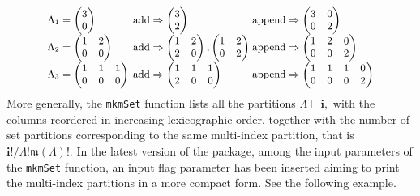 \[{\small \begin{array}{lll}
\Lambda_1= \begin{pmatrix}
3 \\
0
\end{pmatrix} & \!\!\!\!\hbox{add} \Rightarrow \begin{pmatrix}
3 \\
2
\end{pmatrix}  & \!\!\!\!\!\hbox{append} \Rightarrow \begin{pmatrix}
3 & 0 \\
0 & 2
\end{pmatrix}\\
\Lambda_2= \begin{pmatrix}
1 & 2 \\
0 & 0
\end{pmatrix} &\!\!\!\!\hbox{add} \Rightarrow \begin{pmatrix}
1 & 2 \\
2 & 0
\end{pmatrix}, \begin{pmatrix}
1 & 2 \\
0 & 2
\end{pmatrix} & \!\!\!\!\!\hbox{append} \Rightarrow \begin{pmatrix}
1 & 2 & 0\\
0 & 0 & 2
\end{pmatrix} \\
\Lambda_3=\begin{pmatrix}
1 & 1 & 1 \\
0 & 0 & 0
\end{pmatrix} & \!\!\!\!\hbox{add} \Rightarrow \begin{pmatrix}
1 & 1 & 1 \\
2 & 0 & 0
\end{pmatrix} &  \!\!\!\!\!\hbox{append} \Rightarrow \begin{pmatrix}
1 & 1 & 1 & 0 \\
0 & 0 & 0 & 2
\end{pmatrix} 
\end{array}}\] More generally, the \texttt{mkmSet} function lists all
the partitions \(\Lambda \vdash \boldsymbol{i},\) with the columns
reordered in increasing lexicographic order, together with the number of
set partitions corresponding to the same multi-index partition, that is
\(\boldsymbol{i}!/\Lambda! \mathfrak{m}(\Lambda)!.\) In the latest
version of the  package, among the input parameters
of the \texttt{mkmSet} function, an input flag parameter has been
inserted aiming to print the multi-index partitions in a more compact
form. See the following example.

